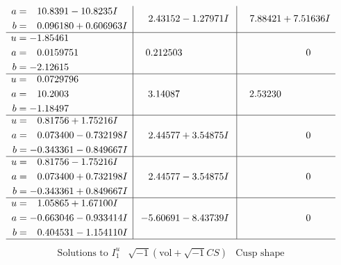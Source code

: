 \documentclass[1p]{elsarticle_modified}
\theoremstyle{definition}
\newcommand{\I}{\sqrt{-1}}
\begin{document}
$$\begin{array}{c|c|c}
\begin{aligned}
a &= \phantom{-}10.8391 - 10.8235 I \\
b &= \phantom{-}0.096180 + 0.606963 I\end{aligned}
 & \phantom{-}2.43152 - 1.27971 I & \phantom{-}7.88421 + 7.51636 I \\ \hline\begin{aligned}
u &= -1.85461\phantom{ +0.000000I} \\
a &= \phantom{-}0.0159751\phantom{ +0.000000I} \\
b &= -2.12615\phantom{ +0.000000I}\end{aligned}
 & \phantom{-}0.212503\phantom{ +0.000000I} & \phantom{-0.000000 } 0 \\ \hline\begin{aligned}
u &= \phantom{-}0.0729796\phantom{ +0.000000I} \\
a &= \phantom{-}10.2003\phantom{ +0.000000I} \\
b &= -1.18497\phantom{ +0.000000I}\end{aligned}
 & \phantom{-}3.14087\phantom{ +0.000000I} & \phantom{-}2.53230\phantom{ +0.000000I} \\ \hline\begin{aligned}
u &= \phantom{-}0.81756 + 1.75216 I \\
a &= \phantom{-}0.073400 - 0.732198 I \\
b &= -0.343361 - 0.849667 I\end{aligned}
 & \phantom{-}2.44577 + 3.54875 I & \phantom{-0.000000 } 0 \\ \hline\begin{aligned}
u &= \phantom{-}0.81756 - 1.75216 I \\
a &= \phantom{-}0.073400 + 0.732198 I \\
b &= -0.343361 + 0.849667 I\end{aligned}
 & \phantom{-}2.44577 - 3.54875 I & \phantom{-0.000000 } 0 \\ \hline\begin{aligned}
u &= \phantom{-}1.05865 + 1.67100 I \\
a &= -0.663046 - 0.933414 I \\
b &= \phantom{-}0.404531 - 1.154110 I\end{aligned}
 & -5.60691 - 8.43739 I & \phantom{-0.000000 } 0\\
 \hline 
 \end{array}$$\newpage$$\begin{array}{c|c|c}  
\text{Solutions to }I^u_{1}& \I (\text{vol} + \sqrt{-1}CS) & \text{Cusp shape}\\

\end{array}$$
\end{document}
